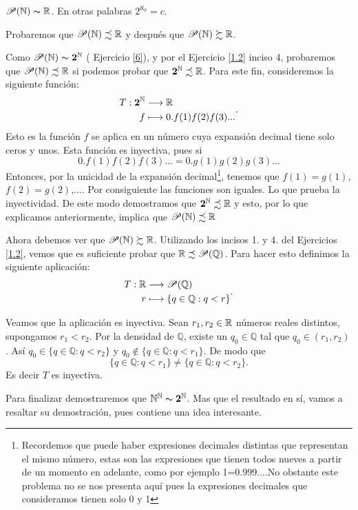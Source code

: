 \begin{teorema}{} $\mathscr{P}(\mathbb{N})\thicksim\mathbb{R}$. En otras palabras $2^{\aleph_0}=c$.
\end{teorema}
\begin{demo} Probaremos que $\mathscr{P}(\mathbb{N})\precsim\mathbb{R}$ y después que
$\mathscr{P}(\mathbb{N})\succsim\mathbb{R}$.

 Como $\mathscr{P}(\mathbb{N})\thicksim\mathbf{2}^{\mathbb{N}}$ ( Ejercicio \vref{6}), y por el
 Ejercicio \vref{1.2} inciso 4, probaremos que $\mathscr{P}(\mathbb{N})\precsim\mathbb{R}$ si podemos
 probar que $\mathbf{2}^{\mathbb{N}}\precsim \mathbb{R}$. Para este fin,
 consideremos la siguiente función:
 \[
    \begin{split}
          T:\mathbf{2}^{\mathbb{N}}&\longrightarrow \mathbb{R}\\
           f&\longmapsto 0.f(1)f(2)f(3)...\\
    \end{split}
 .\]
Esto es la función $f$ se aplica en un número cuya expansión
decimal tiene solo ceros y unos. Esta función es inyectiva, pues
si
\[0.f(1)f(2)f(3)...=0.g(1)g(2)g(3)...\]
Entonces, por la unicidad de la expansión
decimal\footnote{Recordemos que puede haber expresiones decimales
distintas que representan el mismo número, estas son las
expresiones que tienen todos nueves a partir de un momento en
adelante, como por ejemplo 1=0.999....No obstante este problema no
se nos presenta aquí pues la expresiones decimales que
consideramos tienen solo 0 y 1}, tenemos que $f(1)=g (1)$,
$f(2)=g(2)$,.... Por consiguiente las funciones son iguales. Lo
que prueba la inyectividad. De este modo demostramos que
$\mathbf{2}^{\mathbb{N}}\precsim \mathbb{R}$ y esto, por lo que explicamos
anteriormente, implica que $\mathscr{P}(\mathbb{N})\precsim \mathbb{R}$

Ahora debemos ver que $\mathscr{P}(\mathbb{N})\succsim\mathbb{R}$. Utilizando
los  incisos 1. y 4. del Ejercicios \vref{1.2}, vemos que es
suficiente probar que $\mathbb{R}\precsim \mathscr{P}(\mathbb{Q})$. Para
hacer esto definimos la siguiente aplicación:
\[
   \begin{split}
        T:\mathbb{R} &\longrightarrow \mathscr{P}(\mathbb{Q})\\
        r &\longmapsto \{q\in\mathbb{Q}:q<r\}
   \end{split}
.\]

Veamos que  la aplicación es inyectiva. Sean $r_1,r_2\in\mathbb{R}$
números reales distintos, supongamos $r_1<r_2$. Por la densidad
de $\mathbb{Q}$, existe un $q_0\in\mathbb{Q}$ tal que
$q_0\in(r_1,r_2)$. Así $q_0\in\{q\in\mathbb{Q}:q<r_2\}$ y
$q_0\notin\{q\in\mathbb{Q}:q<r_1\}$. De modo que
\[\{q\in\mathbb{Q}:q<r_1\}\neq\{q\in\mathbb{Q}:q<r_2\}.\]
Es decir $T$ es inyectiva.
\end{demo}
Para finalizar demostraremos que
$\mathbb{N}^{\mathbb{N}}\thicksim\mathbf{2}^{\mathbb{N}}$. Mas que el resultado en
sí, vamos a resaltar su demostración, pues contiene una
idea interesante.

